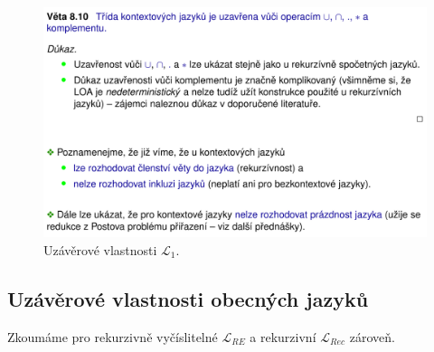 \begin{figure}[H]
    \centering
    \includegraphics[width=1\linewidth]{uzaverove_vlastnosti_L1.pdf}
    \caption{Uzávěrové vlastnosti $\mathcal{L}_1$.}
\end{figure}

\subsection{Uzávěrové vlastnosti obecných jazyků}

\begin{compactitem}
    \item Zkoumáme pro rekurzivně vyčíslitelné $\mathcal{L}_{RE}$ a rekurzivní $\mathcal{L}_{Rec}$ zároveň.
\end{compactitem}



